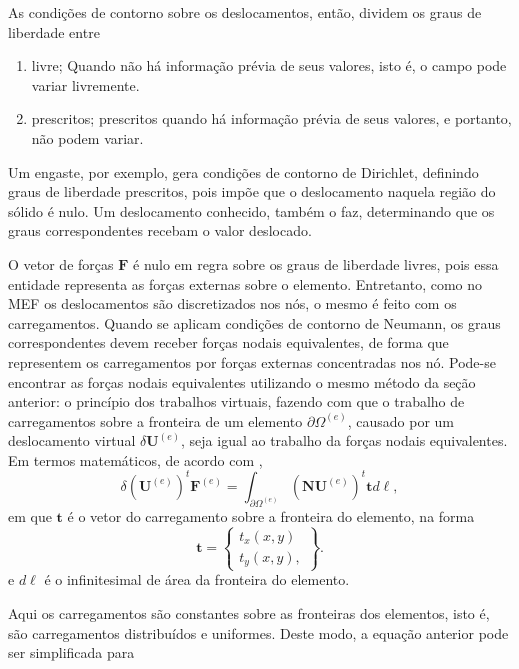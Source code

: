 As condições de contorno sobre os deslocamentos, então, dividem os graus de liberdade entre 

\begin{enumerate}
    \item livre;
    Quando não há informação prévia de seus valores, isto é, o campo pode variar livremente.
    \item prescritos;
    prescritos quando há informação prévia de seus valores, e portanto, não podem variar.
    \cite{LOGAN}
\end{enumerate}

Um engaste, por exemplo, gera condições de contorno de Dirichlet, definindo graus de liberdade prescritos, pois impõe que o deslocamento naquela região do sólido é nulo. Um deslocamento conhecido, também o faz, determinando que os graus correspondentes recebam o valor deslocado.

O vetor de forças $\bm{F}$ é nulo em regra sobre os graus de liberdade livres, pois essa entidade representa as forças externas sobre o elemento. Entretanto, como no MEF os deslocamentos são discretizados nos nós, o mesmo é feito com os carregamentos. Quando se aplicam condições de contorno de Neumann, os graus correspondentes devem receber forças nodais equivalentes, de forma que representem os carregamentos por forças externas concentradas nos nó. Pode-se encontrar as forças nodais equivalentes utilizando o mesmo método da seção anterior: o princípio dos trabalhos virtuais, fazendo com que o trabalho de carregamentos sobre a fronteira de um elemento $\partial \Omega^{(e)}$, causado por um deslocamento virtual $\delta \bm{U}^{(e)}$, seja igual ao trabalho da forças nodais equivalentes. Em termos matemáticos, de acordo com ,
\begin{equation}
    \delta (\bm{U}^{(e)})^t \bm{F}^{(e)} = \int_{\partial \Omega^{(e)}} (\bm{N}\bm{U}^{(e)})^t \bm{t} d \ell,
\end{equation}
em que $\bm{t}$ é o vetor do carregamento sobre a fronteira do elemento, na forma
\begin{equation}
    \bm{t} = \begin{Bmatrix}
        t_x(x,y) \\ t_y(x,y),
    \end{Bmatrix}.
\end{equation}
e $d\ell$ é o infinitesimal de área da fronteira do elemento.

Aqui os carregamentos são constantes sobre as fronteiras dos elementos, isto é, são carregamentos distribuídos e uniformes. Deste modo, a equação anterior pode ser simplificada para

